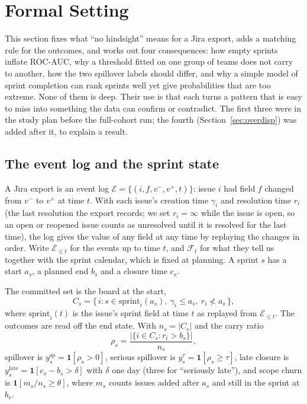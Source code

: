 
\section{Formal Setting}
\label{sec:theory}

This section fixes what ``no hindsight'' means for a Jira export, adds a matching rule for the outcomes, and works out four consequences: how empty sprints inflate ROC-AUC, why a threshold fitted on one group of teams does not carry to another, how the two spillover labels should differ, and why a simple model of sprint completion can rank sprints well yet give probabilities that are too extreme. None of them is deep. Their use is that each turns a pattern that is easy to miss into something the data can confirm or contradict. The first three were in the study plan before the full-cohort run; the fourth (Section~\ref{sec:overdisp}) was added after it, to explain a result.

\subsection{The event log and the sprint state}

A Jira export is an event log $\mathcal{E} = \{(i, f, v^{-}, v^{+}, t)\}$: issue $i$ had field $f$ changed from $v^{-}$ to $v^{+}$ at time $t$. With each issue's creation time $\gamma_i$ and resolution time $r_i$ (the last resolution the export records; we set $r_i = \infty$ while the issue is open, so an open or reopened issue counts as unresolved until it is resolved for the last time), the log gives the value of any field at any time by replaying the changes in order. Write $\mathcal{E}_{\le t}$ for the events up to time $t$, and $\mathcal{F}_t$ for what they tell us together with the sprint calendar, which is fixed at planning. A sprint $s$ has a start $a_s$, a planned end $b_s$ and a closure time $c_s$.

The committed set is the board at the start,
\begin{equation}
C_s = \{\, i : s \in \mathrm{sprint}_i(a_s),\ \gamma_i \le a_s,\ r_i \not< a_s \,\},
\label{eq:committed}
\end{equation}
where $\mathrm{sprint}_i(t)$ is the issue's sprint field at time $t$ as replayed from $\mathcal{E}_{\le t}$. The outcomes are read off the end state. With $n_s = |C_s|$ and the carry ratio
\begin{equation}
\rho_s = \frac{|\{ i \in C_s : r_i > b_s \}|}{n_s},
\end{equation}
spillover is $y^{\mathrm{sp}}_s = \mathbf{1}[\rho_s > 0]$, serious spillover is $y^{\tau}_s = \mathbf{1}[\rho_s \ge \tau]$, late closure is $y^{\mathrm{late}}_s = \mathbf{1}[c_s - b_s > \delta]$ with $\delta$ one day (three for ``seriously late''), and scope churn is $\mathbf{1}[m_s / n_s \ge \theta]$, where $m_s$ counts issues added after $a_s$ and still in the sprint at $b_s$.

